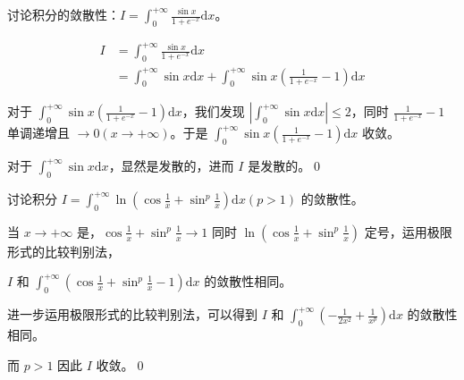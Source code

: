 \begin{ques}
	讨论积分的敛散性：$\displaystyle I=\int _{0}^{+\infty }\frac{\sin x}{1+e^{-x}}\mathrm{d} x$。
\end{ques}




\begin{align*}
	I & =\int _{0}^{+\infty }\frac{\sin x}{1+e^{-x}}\mathrm{d} x\\
	& =\int _{0}^{+\infty }\sin x\mathrm{d} x+\int _{0}^{+\infty }\sin x\left(\frac{1}{1+e^{-x}} -1\right)\mathrm{d} x
\end{align*}

对于 $\displaystyle \int _{0}^{+\infty }\sin x\left(\frac{1}{1+e^{-x}} -1\right)\mathrm{d} x$，我们发现 $\displaystyle \left| \int _{0}^{+\infty }\sin x\mathrm{d} x\right| \leqslant 2$，同时 $\displaystyle \frac{1}{1+e^{-x}} -1$ 单调递增且 $\displaystyle \rightarrow 0\left( x\rightarrow +\infty \right)$。于是 $\displaystyle \int _{0}^{+\infty }\sin x\left(\frac{1}{1+e^{-x}} -1\right)\mathrm{d} x$ 收敛。

对于 $\displaystyle \int _{0}^{+\infty }\sin x\mathrm{d} x$，显然是发散的，进而 $\displaystyle I$ 是发散的。\qed 



\begin{ques}
	讨论积分 $\displaystyle I=\int _{0}^{+\infty }\ln\left(\cos\frac{1}{x} +\sin^{p}\frac{1}{x}\right)\mathrm{d} x( p >1)$ 的敛散性。
\end{ques}



当 $\displaystyle x\rightarrow +\infty $ 是，$\displaystyle \cos\frac{1}{x} +\sin^{p}\frac{1}{x}\rightarrow 1$ 同时 $\displaystyle \ln\left(\cos\frac{1}{x} +\sin^{p}\frac{1}{x}\right)$ 定号，运用极限形式的比较判别法，

$\displaystyle I$ 和 $\displaystyle \int _{0}^{+\infty }\left(\cos\frac{1}{x} +\sin^{p}\frac{1}{x} -1\right)\mathrm{d} x$ 的敛散性相同。

进一步运用极限形式的比较判别法，可以得到 $\displaystyle I$ 和 $\displaystyle \int _{0}^{+\infty }\left( -\frac{1}{2x^{2}} +\frac{1}{x^{p}}\right)\mathrm{d} x$ 的敛散性相同。

而 $\displaystyle p >1$ 因此 $\displaystyle I$ 收敛。\qed 


\ifx\allfiles\undefined

\fi
